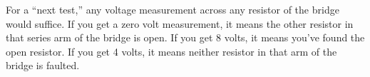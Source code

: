 For a ``next test,'' any voltage measurement across any resistor of the bridge would suffice.  If you get a zero volt measurement, it means the other resistor in that series arm of the bridge is open.  If you get 8 volts, it means you've found the open resistor.  If you get 4 volts, it means neither resistor in that arm of the bridge is faulted.



